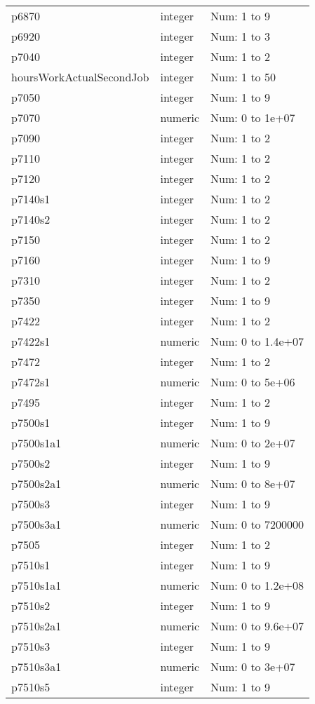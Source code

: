 \begin{table}[!htbp]
\begin{tabular}{p{}p{}p{}}
p6870 & integer & Num: 1 to 9 \\ 
p6920 & integer & Num: 1 to 3 \\ 
p7040 & integer & Num: 1 to 2 \\ 
hoursWorkActualSecondJob & integer & Num: 1 to 50 \\ 
p7050 & integer & Num: 1 to 9 \\ 
p7070 & numeric & Num: 0 to 1e+07 \\ 
p7090 & integer & Num: 1 to 2 \\ 
p7110 & integer & Num: 1 to 2 \\ 
p7120 & integer & Num: 1 to 2 \\ 
p7140s1 & integer & Num: 1 to 2 \\ 
p7140s2 & integer & Num: 1 to 2 \\ 
p7150 & integer & Num: 1 to 2 \\ 
p7160 & integer & Num: 1 to 9 \\ 
p7310 & integer & Num: 1 to 2 \\ 
p7350 & integer & Num: 1 to 9 \\ 
p7422 & integer & Num: 1 to 2 \\ 
p7422s1 & numeric & Num: 0 to 1.4e+07 \\ 
p7472 & integer & Num: 1 to 2 \\ 
p7472s1 & numeric & Num: 0 to 5e+06 \\ 
p7495 & integer & Num: 1 to 2 \\ 
p7500s1 & integer & Num: 1 to 9 \\ 
p7500s1a1 & numeric & Num: 0 to 2e+07 \\ 
p7500s2 & integer & Num: 1 to 9 \\ 
p7500s2a1 & numeric & Num: 0 to 8e+07 \\ 
p7500s3 & integer & Num: 1 to 9 \\ 
p7500s3a1 & numeric & Num: 0 to 7200000 \\ 
p7505 & integer & Num: 1 to 2 \\ 
p7510s1 & integer & Num: 1 to 9 \\ 
p7510s1a1 & numeric & Num: 0 to 1.2e+08 \\ 
p7510s2 & integer & Num: 1 to 9 \\ 
p7510s2a1 & numeric & Num: 0 to 9.6e+07 \\ 
p7510s3 & integer & Num: 1 to 9 \\ 
p7510s3a1 & numeric & Num: 0 to 3e+07 \\ 
p7510s5 & integer & Num: 1 to 9 \\ 

\end{tabular}
\end{table}
